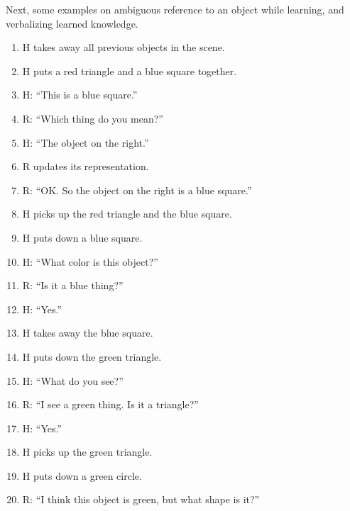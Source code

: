 \documentclass{article}
\begin{document}
\noindent
Next, some examples on ambiguous reference to an object while
learning, and verbalizing learned knowledge.
\begin{enumerate}
\item \label{lvl1a:step1} H takes away all previous objects in the
  scene.

\item \label{lvl1a:step2} H puts a red triangle and a blue square
  together.

\item \label{lvl1a:step3} 
  H: ``This is a blue square.''\\

\item \label{lvl1a:step4} 
  R: ``Which thing do you mean?''

\item \label{lvl1a:step5} 
  H: ``The object on the right.''

\item \label{lvl1a:step6}
  R updates its representation.

\item \label{lvl1a:step7} 
  R: ``OK. So the object on the right is a blue square.''

\item \label{lvl1a:step8} 
  H picks up the red triangle and the blue square.

\item \label{lvl1a:step9}
  H puts down a blue square.
  
\item \label{lvl1a:step10}
  H: ``What color is this object?''

\item \label{lvl1a:step11}
  R: ``Is it a blue thing?''

\item \label{lvl1a:step12}
  H: ``Yes.''

\item \label{lvl1a:step13}
  H takes away the blue square.

\item \label{lvl1a:step14}
  H puts down the green triangle.

\item \label{lvl1a:step15}
  H: ``What do you see?''

\item \label{lvl1a:step16}
  R: ``I see a green thing. Is it a triangle?''
  
\item \label{lvl1a:step17}
  H: ``Yes.''

\item \label{lvl1a:step18}
  H picks up the green triangle.

\item \label{lvl1a:step19}
  H puts down a green circle.

\item \label{lvl1a:step20}
  R: ``I think this object is green, but what shape is it?''

\end{enumerate}
\end{document}
